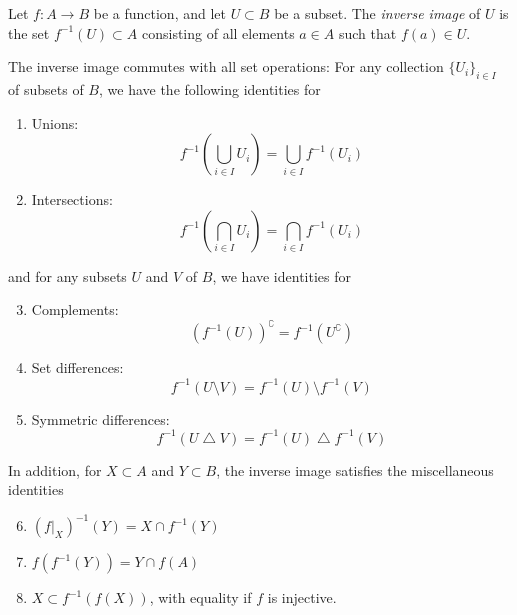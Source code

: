 \documentclass[12pt]{article}
\begin{document}
Let $f: A \longrightarrow B$ be a function, and let $U \subset B$ be a subset. The  {\em inverse image} of $U$ is the set $f^{-1}(U) \subset A$ consisting of all elements $a \in A$ such that $f(a) \in U$.

The inverse image commutes with all set operations: For any collection $\{U_i\}_{i \in I}$ of subsets of $B$, we have the following identities for
\begin{enumerate}
\item Unions:
$$f^{-1}\left(\bigcup_{i \in I} U_i\right) = \bigcup_{i \in I} f^{-1}(U_i)$$
\item Intersections:
$$f^{-1}\left(\bigcap_{i \in I} U_i\right) = \bigcap_{i \in I} f^{-1}(U_i)$$
\end{enumerate}
and for any subsets $U$ and $V$ of $B$, we have identities for
\begin{enumerate}
\setcounter{enumi}{2}
\item Complements:
$$\left(f^{-1}(U)\right)^\complement = f^{-1}(U^\complement)$$
\item Set differences:
$$f^{-1}(U \setminus V) = f^{-1}(U) \setminus f^{-1}(V)$$
\item Symmetric differences:
$$f^{-1}(U \bigtriangleup V) = f^{-1}(U) \bigtriangleup f^{-1}(V)$$
\end{enumerate}
In addition, for $X \subset A$ and $Y \subset B$, the inverse image satisfies the miscellaneous identities
\begin{enumerate}
\setcounter{enumi}{5}
\item $(f|_X)^{-1}(Y)=X\cap f^{-1}(Y)$
\item $f\left(f^{-1}(Y)\right) = Y\cap f(A)$
\item $X \subset f^{-1}(f(X))$, with equality if $f$ is injective.
\end{enumerate}
\end{document}
